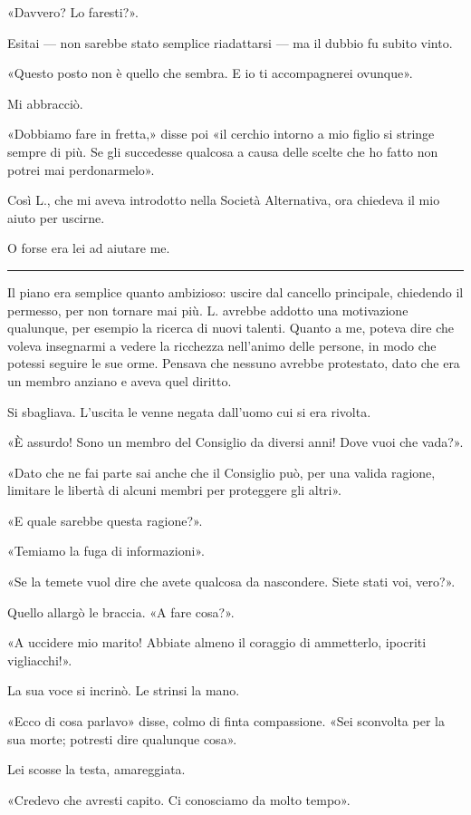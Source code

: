 «Davvero? Lo faresti?».

Esitai --- non sarebbe stato semplice riadattarsi --- ma il dubbio fu subito vinto.

«Questo posto non è quello che sembra. E io ti accompagnerei ovunque».

Mi abbracciò.

«Dobbiamo fare in fretta,» disse poi «il cerchio intorno a mio figlio si stringe sempre di più. Se
gli succedesse qualcosa a causa delle scelte che ho fatto non potrei mai perdonarmelo».

Così L., che mi aveva introdotto nella Società Alternativa, ora chiedeva il mio aiuto per uscirne.

O forse era lei ad aiutare me.

\plainbreak{1}

Il piano era semplice quanto ambizioso: uscire dal cancello principale, chiedendo il permesso, per
non tornare mai più. L. avrebbe addotto una motivazione qualunque, per esempio la ricerca di nuovi
talenti. Quanto a me, poteva dire che voleva insegnarmi a vedere la ricchezza nell'animo delle
persone, in modo che potessi seguire le sue orme. Pensava che nessuno avrebbe protestato, dato che
era un membro anziano e aveva quel diritto.

Si sbagliava. L'uscita le venne negata dall'uomo cui si era rivolta.

«È assurdo! Sono un membro del Consiglio da diversi anni! Dove vuoi che vada?».

«Dato che ne fai parte sai anche che il Consiglio può, per una valida ragione, limitare le libertà
di alcuni membri per proteggere gli altri».

«E quale sarebbe questa ragione?».

«Temiamo la fuga di informazioni».

«Se la temete vuol dire che avete qualcosa da nascondere. Siete stati voi, vero?».

Quello allargò le braccia. «A fare cosa?».

«A uccidere mio marito! Abbiate almeno il coraggio di ammetterlo, ipocriti vigliacchi!».

La sua voce si incrinò. Le strinsi la mano.

«Ecco di cosa parlavo» disse, colmo di finta compassione. «Sei sconvolta per la sua morte; potresti
dire qualunque cosa».

Lei scosse la testa, amareggiata.

«Credevo che avresti capito. Ci conosciamo da molto tempo».

